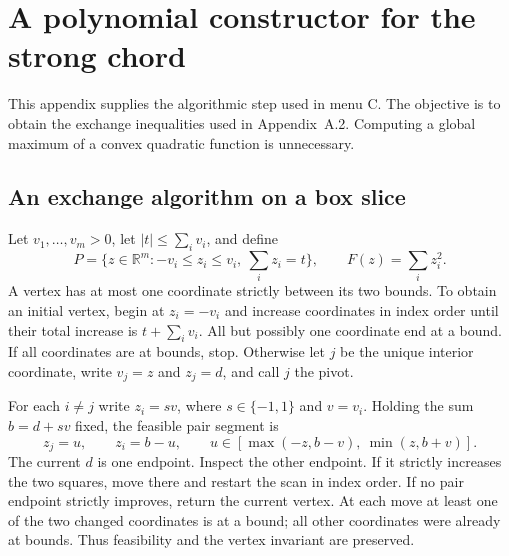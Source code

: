 \documentclass[11pt,a4paper]{article}
\begin{document}
\clearpage
\section{A polynomial constructor for the strong chord}
\label{app:polynomial-chord}

This appendix supplies the algorithmic step used in menu C. The objective
is to obtain the exchange inequalities used in Appendix~A.2. Computing a
global maximum of a convex quadratic function is unnecessary.

\subsection{An exchange algorithm on a box slice}
Let $v_1,\ldots,v_m>0$, let $|t|\le\sum_i v_i$, and define
\[
 P=\{z\in\mathbb R^m:-v_i\le z_i\le v_i,\ \sum_i z_i=t\},
 \qquad F(z)=\sum_i z_i^2.
\]
A vertex has at most one coordinate strictly between its two bounds. To
obtain an initial vertex, begin at $z_i=-v_i$ and increase coordinates in
index order until their total increase is $t+\sum_i v_i$. All but possibly
one coordinate end at a bound. If all coordinates are at bounds, stop.
Otherwise let $j$ be the unique interior coordinate, write $v_j=z$ and
$z_j=d$, and call $j$ the pivot.

For each $i\ne j$ write $z_i=sv$, where $s\in\{-1,1\}$ and $v=v_i$.
Holding the sum $b=d+sv$ fixed, the feasible pair segment is
\[
 z_j=u,\qquad z_i=b-u,\qquad
 u\in[\max(-z,b-v),\ \min(z,b+v)].
\]
The current $d$ is one endpoint. Inspect the other endpoint. If it strictly
increases the two squares, move there and restart the scan in index order.
If no pair endpoint strictly improves, return the current vertex. At each
move at least one of the two changed coordinates is at a bound; all other
coordinates were already at bounds. Thus feasibility and the vertex
invariant are preserved.
\end{document}
